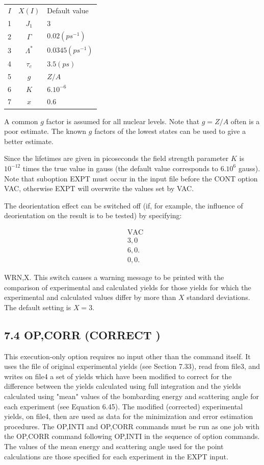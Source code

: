 \documentclass[10pt]{article}
\begin{document}
\begin{center}
\begin{tabular}{ccl}
$I$ & $X(I)$ & Default value \\
1 & $J_{1}$ & 3 \\
2 & $\Gamma$ & $0.02\left(p s^{-1}\right)$ \\
3 & $\Lambda^{*}$ & $0.0345\left(p s^{-1}\right)$ \\
4 & $\tau_{c}$ & $3.5(p s)$ \\
5 & $g$ & $Z / A$ \\
6 & $K$ & $6.10^{-6}$ \\
7 & $x$ & 0.6 \\
\end{tabular}
\end{center}

A common $g$ factor is assumed for all nuclear levels. Note that $g=Z / A$ often is a poor estimate. The known $g$ factors of the lowest states can be used to give a better estimate.

Since the lifetimes are given in picoseconds the field strength parameter $K$ is $10^{-12}$ times the true value in gauss (the default value corresponds to $6.10^{6}$ gauss). Note that suboption EXPT must occur in the input file before the CONT option VAC, otherwise EXPT will overwrite the values set by VAC.

The deorientation effect can be switched off (if, for example, the influence of deorientation on the result is to be tested) by specifying:

$$
\begin{aligned}
& \mathrm{VAC} \\
& 3,0 \\
& 6,0 . \\
& 0,0 .
\end{aligned}
$$

WRN,X. This switch causes a warning message to be printed with the comparison of experimental and calculated yields for those yields for which the experimental and calculated values differ by more than $X$ standard deviations. The default setting is $X=3$.

\subsection*{7.4 OP,CORR (CORRECT )}
This execution-only option requires no input other than the command itself. It uses the file of original experimental yields (see Section 7.33), read from file3, and writes on file4 a set of yields which have been modified to correct for the difference between the yields calculated using full integration and the yields calculated using "mean" values of the bombarding energy and scattering angle for each experiment (see Equation 6.45). The modified (corrected) experimental yields, on file4, then are used as data for the minimization and error estimation procedures. The OP,INTI and OP,CORR commands must be run as one job with the OP,CORR command following OP,INTI in the sequence of option commands. The values of the mean energy and scattering angle used for the point calculations are those specified for each experiment in the EXPT input.
\end{document}
